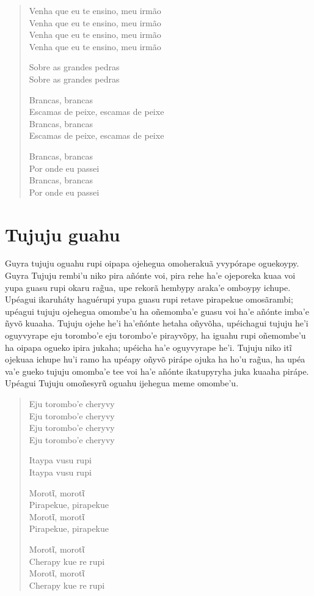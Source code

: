 \begin{verse}
Venha que eu te ensino, meu irmão\\
Venha que eu te ensino, meu irmão\\
Venha que eu te ensino, meu irmão\\
Venha que eu te ensino, meu irmão

Sobre as grandes pedras\\
Sobre as grandes pedras

Brancas, brancas\\
Escamas de peixe, escamas de peixe\\
Brancas, brancas\\
Escamas de peixe, escamas de peixe

Brancas, brancas\\
Por onde eu passei\\
Brancas, brancas\\
Por onde eu passei
\end{verse}

\chapter{Tujuju guahu}

Guyra tujuju oguahu rupi oipapa ojehegua omoherakuã yvypórape oguekoypy.
Guyra Tujuju rembi'u niko pira añónte voi, pira rehe ha'e ojeporeka kuaa
voi yupa guasu rupi okaru rag̃ua, upe rekorã hembypy araka'e omboypy
ichupe. Upéagui ikaruháty haguérupi yupa guasu rupi retave pirapekue
omosãrambi; upéagui tujuju ojehegua omombe'u ha oñemomba'e guasu voi
ha'e añónte imba'e ñyvõ kuaaha. Tujuju ojehe he'i ha'eñónte hetaha
oñyvõha, upéichagui tujuju he'i oguyvyrape eju torombo'e eju torombo'e
pirayvõpy, ha iguahu rupi oñemombe'u ha oipapa ogueko ipira jukaha;
upéicha ha'e oguyvyrape he'i. Tujuju niko itĩ ojekuaa ichupe hu'i ramo
ha upéapy oñyvõ pirápe ojuka ha ho'u rag̃ua, ha upéa va'e gueko tujuju
omomba'e tee voi ha'e añónte ikatupyryha juka kuaaha pirápe. Upéagui
Tujuju omoñesyrũ oguahu ijehegua meme omombe'u.

\begin{verse}
Eju torombo'e cheryvy\\
Eju torombo'e cheryvy\\
Eju torombo'e cheryvy\\
Eju torombo'e cheryvy

Itaypa vusu rupi\\
Itaypa vusu rupi

Morotῖ, morotῖ\\
Pirapekue, pirapekue\\
Morotῖ, morotῖ\\
Pirapekue, pirapekue

Morotῖ, morotῖ\\
Cherapy kue re rupi\\
Morotῖ, morotῖ\\
Cherapy kue re rupi
\end{verse}


